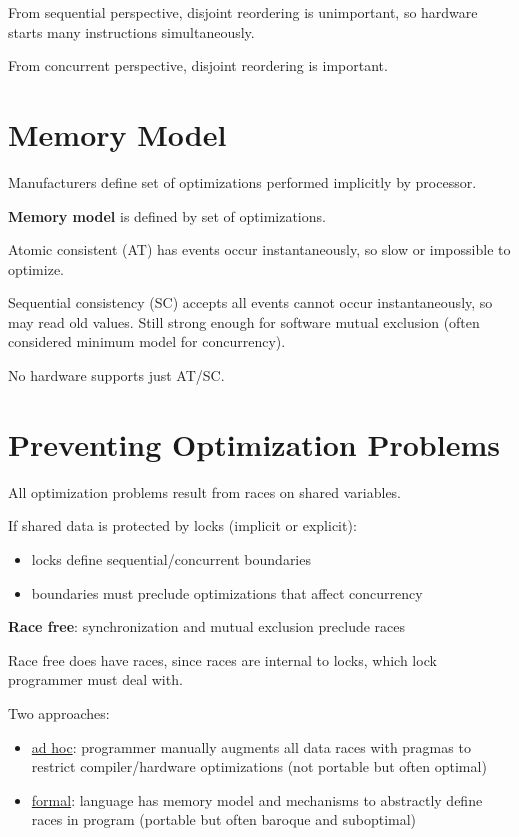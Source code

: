 \documentclass[11pt]{article}
\begin{document}
From sequential perspective, disjoint reordering is unimportant, so hardware starts many instructions
simultaneously.

From concurrent perspective, disjoint reordering is important.
\section{Memory Model}
\label{sec:org2a0b9ff}
Manufacturers define set of optimizations performed implicitly by processor.

\textbf{Memory model} is defined by set of optimizations.

Atomic consistent (AT) has events occur instantaneously, so slow or impossible to optimize.

Sequential consistency (SC) accepts all events cannot occur instantaneously, so may read old values.
Still strong enough for software mutual exclusion (often considered minimum model for concurrency).

No hardware supports just AT/SC.
\section{Preventing Optimization Problems}
\label{sec:org34a2679}
All optimization problems result from races on shared variables.

If shared data is protected by locks (implicit or explicit):
\begin{itemize}
\item locks define sequential/concurrent boundaries
\item boundaries must preclude optimizations that affect concurrency
\end{itemize}

\textbf{Race free}: synchronization and mutual exclusion preclude races

Race free does have races, since races are internal to locks, which lock programmer must deal with.

Two approaches:
\begin{itemize}
\item \uline{ad hoc}: programmer manually augments all data races with pragmas to restrict compiler/hardware
optimizations (not portable but often optimal)
\item \uline{formal}: language has memory model and mechanisms to abstractly define races in program
(portable but often baroque and suboptimal)
\end{itemize}
\end{document}
